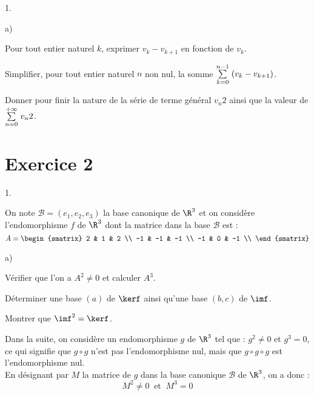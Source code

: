 \documentclass[11pt]{article}%
\begin{document}
\begin{noliste}{1.}
\begin{noliste}{a)}
 \setlength{\itemsep}{2mm}

\item Pour tout entier naturel $k$, exprimer $v_{k} - v_{k + 1}$ en
fonction de $v_{k}$.

\item Simplifier, pour tout entier naturel $n$ non nul, la somme
${\textstyle\sum\limits_{k = 0}^{n-1}}\hspace{.1cm} (v_{k} - v_{k + 1})$.

\item Donner pour finir la nature de la série de terme général
$v_{n}{2}$ ainsi que la valeur de ${\textstyle\sum\limits_{n = 0}^{+ \infty}}\hspace{.1cm} v_{n}{2}$.

\end{noliste}

\end{noliste}

\section*{Exercice 2}

\begin{noliste}{1.}
 \setlength{\itemsep}{4mm}

\item On note $\mathcal{B} = (e_{1}, e_{2}, e_{3})$ la base canonique
de $\R^{3}$ et on considère l'endomorphisme $f$ de $\R^{3}$ dont la
matrice dans la base $\mathcal{B}$ est : 
\[
 A = \begin{smatrix}
2 & 1 & 2 \\
-1 & -1 & -1 \\
-1 & 0 & -1 \\
\end{smatrix}
\]

\begin{noliste}{a)}
 \setlength{\itemsep}{2mm}

\item Vérifier que l'on a $A^{2} \neq 0$ et calculer $A^{3}$. 

\item Déterminer une base $(a)$ de $\kerf$ ainsi qu'une base $(b,c)$ de
$\imf$.

\item Montrer que $\imf^{2} = \kerf$. \\

\end{noliste}

\end{noliste}

\noindent Dans la suite, on considère un endomorphisme $g$ de $\R^{3}$
tel que : $g^{2} \neq 0$ et $g^{3} = 0$, ce qui signifie que $g \circ
g$ n'est pas l'endomorphisme nul, mais que $g \circ g \circ g $ est
l'endomorphisme nul. \\
En désignant par $M$ la matrice de $g$ dans la base canonique
$\mathcal{B}$ de $\R^{3}$, on a donc : 
\[
 M^{2} \neq 0 \ \text{ et } \ M^{3} = 0 
\]
\end{document}

